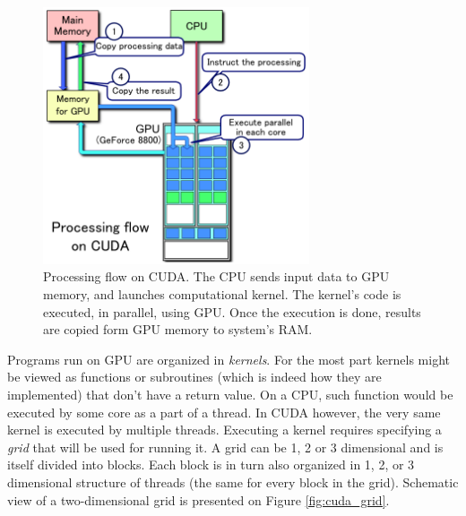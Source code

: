 \begin{figure}[ht]
    \centering
    \includegraphics[width=0.7\textwidth]{figures/CUDA_processing_flow_(En).png}
    \caption{{\protect{}} Processing flow on CUDA. The CPU sends input data to GPU memory, and launches computational kernel. The kernel's code is executed, in parallel, using GPU. Once the execution is done, results are copied form GPU memory to system's RAM.}
    \label{fig:cuda_flow}
\end{figure}

Programs run on GPU are organized in \emph{kernels}. For the most part kernels might be viewed as functions or subroutines (which is indeed how they are implemented) that don't have a return value. On a CPU, such function would be executed by some core as a part of a thread. In CUDA however, the very same kernel is executed by multiple threads. Executing a kernel requires specifying a \emph{grid} that will be used for running it. A grid can be 1, 2 or 3 dimensional and is itself divided into blocks. Each block is in turn also organized in 1, 2, or 3 dimensional structure of threads (the same for every block in the grid). Schematic view of a two-dimensional grid is presented on Figure \ref{fig:cuda_grid}.

